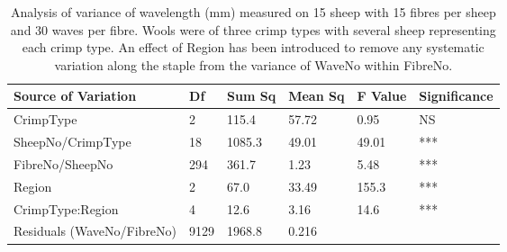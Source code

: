%

\begin{table}[htp]
\centering
\caption{Analysis of variance of wavelength (mm) measured on 15 sheep with 15 fibres per sheep and 30 waves per fibre. Wools were of three crimp types with several sheep representing each crimp type. An effect of Region has been introduced to remove any systematic variation along the staple from the variance of WaveNo within FibreNo.}
\label{tab:sfwavlaovreg}
\vspace{0.1in}
\begin{tabular}{|p{1.4in}|p{0.4in}|p{0.4in}|p{0.4in}|p{0.4in}|p{0.8in}|} \hline
     Source of Variation & Df & Sum Sq  & Mean Sq  & F Value  & Significance  \\  \hline
 CrimpType & 2 & 115.4 & 57.72 & 0.95 & NS  \\
 SheepNo/CrimpType & 18 & 1085.3 & 49.01 &  49.01 & ***    \\ 
 FibreNo/SheepNo & 294 & 361.7 & 1.23 & 5.48 & ***  \\
 Region & 2 & 67.0 & 33.49 & 155.3 &  *** \\
 CrimpType:Region & 4 & 12.6 & 3.16 & 14.6 & *** \\
 Residuals (WaveNo/FibreNo) & 9129 & 1968.8 & 0.216 & & \\ \hline
\end{tabular}
\end{table}

%
